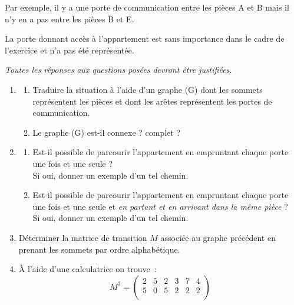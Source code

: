 \par
Par exemple, il y a une porte de communication entre les pièces A et B mais il n'y en a pas entre les pièces B et E.
\par
La porte donnant accès à l'appartement est sans importance dans le cadre de l'exercice et n'a pas été représentée.
\par
\textit{Toutes les réponses aux questions posées devront être justifiées.}
\par
\begin{enumerate}
     \item %
     \par
     \begin{enumerate}[label=\alph*.]
          \item %
          Traduire la situation à l'aide d'un graphe (G) dont les sommets représentent les pièces et dont les arêtes représentent les portes de communication.
          \item %
          Le graphe (G) est-il connexe ? complet ?
     \end{enumerate}
     \par
     \item %
     \par
     \begin{enumerate}[label=\alph*.]
          \item %
          Est-il possible de parcourir l'appartement en empruntant chaque porte une fois et une seule ?\\
          Si oui, donner un exemple d'un tel chemin.
          \item %
          Est-il possible de parcourir l'appartement en empruntant chaque porte une fois et une seule et \textit{en partant et en arrivant dans la même pièce} ?\\
          Si oui, donner un exemple d'un tel chemin.
     \end{enumerate}
     \par
     \item %
     Déterminer la matrice de transition $M$ associée au graphe précédent en prenant les sommets par ordre alphabétique.
     \par
     \item %
     \par
     \`A l'aide d'une calculatrice on trouve~:
     \[ M^3 = \begin{pmatrix}
          2 &5 &2 &3 &7 &4 \\
          5 &0 &5 &2 &2 &2 \\

\end{pmatrix}\]
\end{enumerate}
